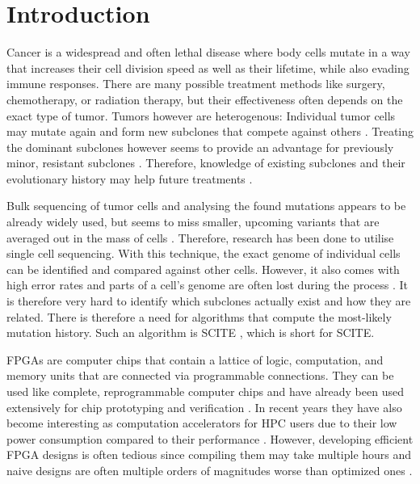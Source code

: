 \chapter{Introduction}
\label{ch:introduction}

Cancer is a widespread and often lethal disease\cite{10.1001/jamaoncol.2021.6987} where body cells mutate in a way that increases their cell division speed as well as their lifetime, while also evading immune responses. There are many possible treatment methods like surgery, chemotherapy, or radiation therapy, but their effectiveness often depends on the exact type of tumor. Tumors however are heterogenous: Individual tumor cells may mutate again and form new subclones that compete against others \cite{nik2012life}. Treating the dominant subclones however seems to provide an advantage for previously minor, resistant subclones \cite{gillies2012evolutionary}. Therefore, knowledge of existing subclones and their evolutionary history may help future treatments \cite{greaves2012clonal, stratton2009cancer, swanton2012intratumor}.

Bulk sequencing of tumor cells and analysing the found mutations appears to be already widely used, but seems to miss smaller, upcoming variants that are averaged out in the mass of cells \cite{navin2014cancer}. Therefore, research has been done to utilise single cell sequencing. With this technique, the exact genome of individual cells can be identified and compared against other cells. However, it also comes with high error rates and parts of a cell's genome are often lost during the process \cite{tree2016}. It is therefore very hard to identify which subclones actually exist and how they are related. There is therefore a need for algorithms that compute the most-likely mutation history. Such an algorithm is \acs{SCITE} \cite{tree2016}, which is short for \acl{SCITE}.

\acp{FPGA} are computer chips that contain a lattice of logic, computation, and memory units that are connected via programmable connections. They can be used like complete, reprogrammable computer chips and have already been used extensively for chip prototyping and verification \cite{rodriguez2007features}. In recent years they have also become interesting as computation accelerators for \ac{HPC} users due to their low power consumption compared to their performance \cite{betkaoui2010comparing}. However, developing efficient \ac{FPGA} designs is often tedious since compiling them may take multiple hours and naive designs are often multiple orders of magnitudes worse than optimized ones \cite{betkaoui2010comparing}.

